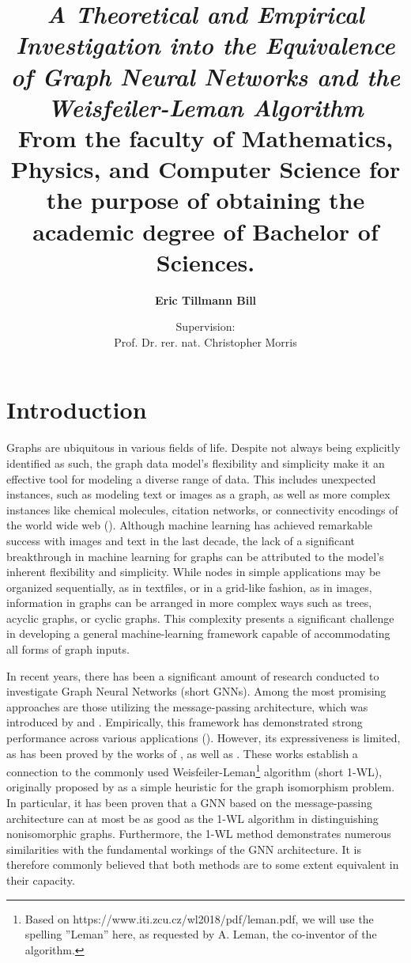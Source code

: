 \documentclass[11pt, dvipsnames, DIV=12]{scrreprt}
\title{\emph{A Theoretical and Empirical Investigation into the Equivalence of Graph Neural Networks and the Weisfeiler-Leman Algorithm}\\
\vspace{20pt}\small{\normalfont From the faculty of Mathematics, Physics, and Computer Science for the purpose of obtaining the academic degree of Bachelor of Sciences.}
}
\author{\textbf{Eric Tillmann Bill}}
\affil{\vspace{100pt}}
\author{Supervision:\\Prof. Dr. rer. nat. Christopher Morris}
\affil{Informatik 6\\RWTH Aachen University}
\date{\vspace{-30pt}}
\theoremstyle{definition}
\begin{document}
\maketitle
\tableofcontents
\newpage



\section{Introduction}
Graphs are ubiquitous in various fields of life. Despite not always being explicitly identified as such, the graph data model's flexibility and simplicity make it an effective tool for modeling a diverse range of data. This includes unexpected instances, such as modeling text or images as a graph, as well as more complex instances like chemical molecules, citation networks, or connectivity encodings of the world wide web (\cite{Mor+2020, Sca+2009}).
Although machine learning has achieved remarkable success with images and text in the last decade, the lack of a significant breakthrough in machine learning for graphs can be attributed to the model's inherent flexibility and simplicity. While nodes in simple applications may be organized sequentially, as in textfiles, or in a grid-like fashion, as in images, information in graphs can be arranged in more complex ways such as trees, acyclic graphs, or cyclic graphs. This complexity presents a significant challenge in developing a general machine-learning framework capable of accommodating all forms of graph inputs.


In recent years, there has been a significant amount of research conducted to investigate Graph Neural Networks (short GNNs). Among the most promising approaches are those utilizing the message-passing architecture, which was introduced by \cite{Gil+2017} and \cite{Sca+2009}. Empirically, this framework has demonstrated strong performance across various applications (\cite{Kip+2017, Ham+2017, Xu2018}). However, its expressiveness is limited, as has been proved by the works of \cite{Morris2018}, as well as \cite{Xu2018}. These works establish a connection to the commonly used Weisfeiler-Leman\footnote{Based on https://www.iti.zcu.cz/wl2018/pdf/leman.pdf, we will use the spelling ''Leman'' here, as requested by A. Leman, the co-inventor of the algorithm.} algorithm (short 1-WL), originally proposed by \cite{Wei+1968} as a simple heuristic for the graph isomorphism problem. In particular, it has been proven that a GNN based on the message-passing architecture can at most be as good as the 1-WL algorithm in distinguishing nonisomorphic graphs. Furthermore, the 1-WL method demonstrates numerous similarities with the fundamental workings of the GNN architecture. It is therefore commonly believed that both methods are to some extent equivalent in their capacity.
\end{document}
